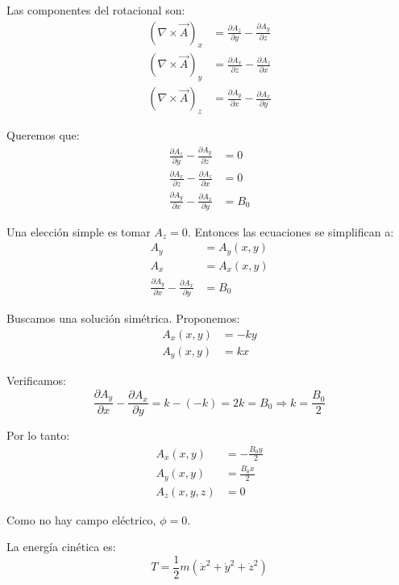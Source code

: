 \documentclass{article}
\begin{document}
Las componentes del rotacional son:
\begin{align}
(\nabla \times \vec{A})_x &= \frac{\partial A_z}{\partial y} - \frac{\partial A_y}{\partial z} \\
(\nabla \times \vec{A})_y &= \frac{\partial A_x}{\partial z} - \frac{\partial A_z}{\partial x} \\
(\nabla \times \vec{A})_z &= \frac{\partial A_y}{\partial x} - \frac{\partial A_x}{\partial y}
\end{align}

Queremos que:
\begin{align}
\frac{\partial A_z}{\partial y} - \frac{\partial A_y}{\partial z} &= 0 \\
\frac{\partial A_x}{\partial z} - \frac{\partial A_z}{\partial x} &= 0 \\
\frac{\partial A_y}{\partial x} - \frac{\partial A_x}{\partial y} &= B_0
\end{align}

Una elección simple es tomar $A_z = 0$. Entonces las ecuaciones se simplifican a:
\begin{align}
A_y &= A_y(x,y) \\
A_x &= A_x(x,y) \\
\frac{\partial A_y}{\partial x} - \frac{\partial A_x}{\partial y} &= B_0
\end{align}

Buscamos una solución simétrica. Proponemos:
\begin{align}
A_x(x,y) &= -k y \\
A_y(x,y) &= k x
\end{align}

Verificamos:
\begin{equation}
\frac{\partial A_y}{\partial x} - \frac{\partial A_x}{\partial y} = k - (-k) = 2k = B_0 \Rightarrow k = \frac{B_0}{2}
\end{equation}

Por lo tanto:
\begin{align}
A_x(x,y) &= -\frac{B_0 y}{2} \\
A_y(x,y) &= \frac{B_0 x}{2} \\
A_z(x,y,z) &= 0
\end{align}

Como no hay campo eléctrico, $\phi = 0$.

La energía cinética es:
\begin{equation}
T = \frac{1}{2}m(\dot{x}^2 + \dot{y}^2 + \dot{z}^2)
\end{equation}
\end{document}
